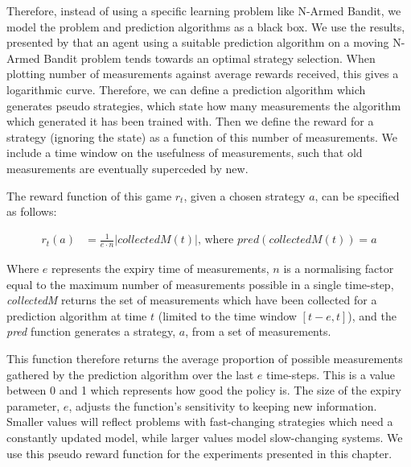 Therefore, instead of using a specific learning problem like N-Armed Bandit, we model the problem and
prediction algorithms as a black box. We use the results, presented by
\citet[p.43]{Sutton1998} that an agent using a suitable prediction algorithm
on a moving N-Armed Bandit problem tends towards an optimal strategy
selection. When plotting number of measurements against average rewards
received, this gives a logarithmic curve. Therefore, we can define a
prediction algorithm which generates pseudo strategies, which state how many
measurements the algorithm which generated it has been trained with. Then we
define the reward for a strategy (ignoring the state) as a
function of this number of measurements. We include a time window on the
usefulness of measurements, such that old measurements are eventually
superceded by new.

The reward function of this game $r_t$, given a chosen strategy $a$, can be specified as follows:

\begin{align*}
r_t \left(a\right) &= \frac{1}{e\cdot n} \left|  \mathit{collectedM}\left(t\right)\right| \text{, where } \mathit{pred}\left( \mathit{collectedM}\left(t\right)\right)=a
\end{align*}

Where $e$ represents the expiry time of measurements, $n$ is a normalising
factor equal to the maximum number of measurements possible in a single time-step,
\emph{collectedM} returns the set of measurements which have been
collected for a prediction algorithm at time $t$ (limited to the time window
$[t-e,t]$), and the \emph{pred} function generates a strategy, $a$, from a set
of measurements.

This function therefore returns the average proportion of possible measurements gathered by the prediction algorithm over the last $e$ time-steps. This is a value between 0 and 1 which represents how good the
policy is. The size of the expiry parameter, $e$, adjusts the
function's sensitivity to keeping new information. Smaller values will reflect
problems with fast-changing strategies which need a constantly updated model,
while larger values model slow-changing systems. We use this pseudo reward function for the experiments presented in this chapter.

